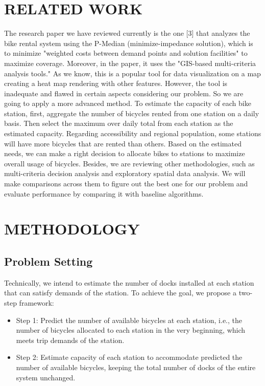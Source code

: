 \documentclass[journal, letterpaper]{IEEEtran}
\begin{document}
\section{RELATED WORK}
\large
The research paper we have reviewed currently is the one [3] that analyzes the bike rental system using the P-Median (minimize-impedance solution), which is to minimize "weighted costs between demand points and solution facilities" to maximize coverage. Moreover, in the paper, it uses the "GIS-based multi-criteria analysis tools." As we know, this is a popular tool for data visualization on a map creating a heat map rendering with other features. However, the tool is inadequate and flawed in certain aspects considering our problem. So we are going to apply a more advanced method. To estimate the capacity of each bike station, first, aggregate the number of bicycles rented from one station on a daily basis. Then select the maximum over daily total from each station as the estimated capacity. Regarding accessibility and regional population, some stations will have more bicycles that are rented than others. Based on the estimated needs, we can make a right decision to allocate bikes to stations to maximize overall usage of bicycles. Besides, we are reviewing other methodologies, such as multi-criteria decision analysis and exploratory spatial data analysis. We will make comparisons across them to figure out the best one for our problem and evaluate performance by comparing it with baseline algorithms.

\section{METHODOLOGY}
\large
\subsection{Problem Setting}
Technically, we intend to estimate the number of docks installed at each station that can satisfy demands of the station. To achieve the goal, we propose a two-step framework:
\begin{itemize}

\item Step 1: Predict the number of available bicycles at each station, i.e., the number of bicycles allocated to each station in the very beginning, which meets trip demands of the station. 
\item Step 2: Estimate capacity of each station to accommodate predicted the number of available bicycles, keeping the total number of docks of the entire system unchanged.  
\end{itemize}  
\end{document}
